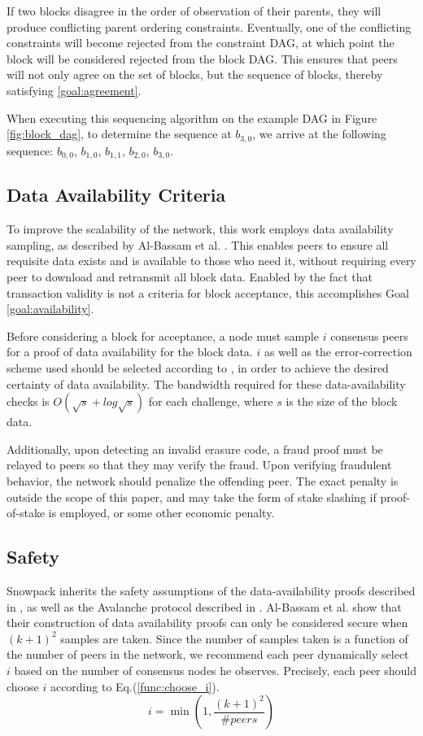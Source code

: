 \documentclass[12pt]{article}
\begin{document}
  If two blocks disagree in the order of observation of their parents, they
  will produce conflicting parent ordering constraints. Eventually, one of the
  conflicting constraints will become rejected from the constraint DAG, at
  which point the block will be considered rejected from the block DAG. This
  ensures that peers will not only agree on the set of blocks, but the sequence
  of blocks, thereby satisfying \ref{goal:agreement}.

  When executing this sequencing algorithm on the example DAG in Figure
  \ref{fig:block_dag}, to determine the sequence at $b_{3,0}$, we arrive at the
  following sequence: $b_{0,0}$, $b_{1,0}$, $b_{1,1}$, $b_{2,0}$, $b_{3,0}$.

\subsection{Data Availability Criteria}
  To improve the scalability of the network, this work employs data
  availability sampling, as described by Al-Bassam et al.
  \cite{albassam2019fraud}. This enables peers to ensure all requisite data
  exists and is available to those who need it, without requiring every peer to
  download and retransmit all block data. Enabled by the fact that transaction
  validity is not a criteria for block acceptance, this accomplishes
  Goal \ref{goal:availability}.

  Before considering a block for acceptance, a node must sample $i$ consensus
  peers for a proof of data availability for the block data. $i$ as well as the
  error-correction scheme used should be selected according to
  \cite{albassam2019fraud}, in order to achieve the desired certainty of data
  availability. The bandwidth required for these data-availability checks is
  $O(\sqrt{s}+log{\sqrt{s}})$ for each challenge, where $s$ is the size of the
  block data.

  Additionally, upon detecting an invalid erasure code, a fraud proof must be
  relayed to peers so that they may verify the fraud. Upon verifying fraudulent
  behavior, the network should penalize the offending peer. The exact penalty
  is outside the scope of this paper, and may take the form of stake slashing
  if proof-of-stake is employed, or some other economic penalty.

\subsection{Safety}
  Snowpack inherits the safety assumptions of the data-availability proofs
  described in \cite{albassam2019fraud}, as well as the Avalanche protocol
  described in \cite{rocket}. Al-Bassam et al. show that their construction of
  data availability proofs can only be considered secure when $(k+1)^2$ samples
  are taken. Since the number of samples taken is a function of the number of
  peers in the network, we recommend each peer dynamically select $i$ based on
  the number of consensus nodes he observes. Precisely, each peer should choose
  $i$ according to Eq.(\ref{func:choose_i}).
  \begin{equation}\label{func:choose_i}
    i = \min(1, \frac{(k+1)^2}{\#peers})
  \end{equation}
\end{document}
